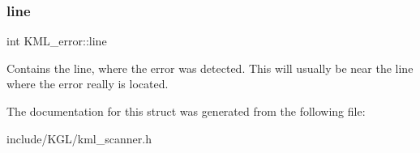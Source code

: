 \subsubsection{\texorpdfstring{line}{line}}
{\footnotesize\ttfamily int K\+M\+L\+\_\+error\+::line}

Contains the line, where the error was detected. This will usually be near the line where the error really is located. 

The documentation for this struct was generated from the following file\+:\begin{DoxyCompactItemize}
\item 
include/\+K\+G\+L/kml\+\_\+scanner.\+h\end{DoxyCompactItemize}
